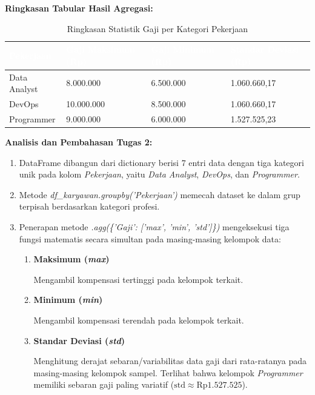 \documentclass[12pt,a4paper]{article}
\newcommand{\thead}[1]{\textcolor{white}{\textbf{#1}}}
\begin{document}
\begin{adjustwidth}{2.25cm}{0pt}
\textbf{Ringkasan Tabular Hasil Agregasi:}
\begin{table}[H]
\centering
\small
\caption{Ringkasan Statistik Gaji per Kategori Pekerjaan}
\label{tab:hasil-tugas2}
\begin{tabularx}{\linewidth}{@{}p{3.2cm}ZZZ@{}}
\toprule
{}\thead{Pekerjaan} & \thead{Gaji Maksimum (Rp)} & \thead{Gaji Minimum (Rp)} & \thead{Standar Deviasi (Rp)} \\
\midrule
{}
Data Analyst & 8.000.000 & 6.500.000 & 1.060.660,17 \\
DevOps       & 10.000.000 & 8.500.000 & 1.060.660,17 \\
Programmer   & 9.000.000 & 6.000.000 & 1.527.525,23 \\
\bottomrule
\end{tabularx}
\end{table}

\textbf{Analisis dan Pembahasan Tugas 2:}
\end{adjustwidth}

\begin{enumerate}[label=\arabic*), leftmargin=3.00cm, labelwidth=0.75cm, labelsep=0cm, align=left]
    \item DataFrame dibangun dari dictionary berisi 7 entri data dengan tiga kategori unik pada kolom \textit{Pekerjaan}, yaitu \textit{Data Analyst}, \textit{DevOps}, dan \textit{Programmer}.
    \item Metode \textit{df\_karyawan.groupby('Pekerjaan')} memecah dataset ke dalam grup terpisah berdasarkan kategori profesi.
    \item Penerapan metode \textit{.agg(\{'Gaji': ['max', 'min', 'std']\})} mengeksekusi tiga fungsi matematis secara simultan pada masing-masing kelompok data:
    \begin{enumerate}[label=\alph*), leftmargin=0.75cm, labelwidth=0.75cm, labelsep=0cm, align=left]
        \item \textbf{Maksimum (\textit{max})}
        
        \hspace*{0.85cm}Mengambil kompensasi tertinggi pada kelompok terkait.
        
        \item \textbf{Minimum (\textit{min})}
        
        \hspace*{0.85cm}Mengambil kompensasi terendah pada kelompok terkait.
        
        \item \textbf{Standar Deviasi (\textit{std})}
        
        \hspace*{0.85cm}Menghitung derajat sebaran/variabilitas data gaji dari rata-ratanya pada masing-masing kelompok sampel. Terlihat bahwa kelompok \textit{Programmer} memiliki sebaran gaji paling variatif ($\text{std} \approx \text{Rp}1.527.525$).
    \end{enumerate}
\end{enumerate}
\end{document}
